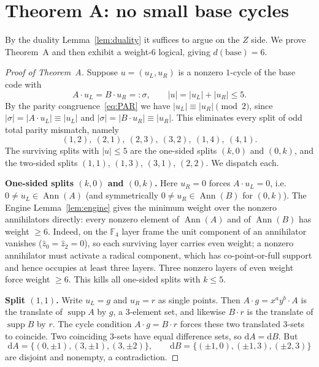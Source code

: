\documentclass[11pt]{article}
\newcommand{\F}[1]{\mathbb{F}_{#1}}
\newcommand{\wt}[1]{\lvert #1\rvert}
\DeclareMathOperator{\Ann}{Ann}
\DeclareMathOperator{\supp}{supp}
\theoremstyle{plain}
\theoremstyle{definition}
\theoremstyle{remark}
\begin{document}
\section{Theorem A: no small base cycles}\label{sec:thmA}

By the duality Lemma~\ref{lem:duality} it suffices to argue on the $Z$ side. We prove
Theorem~A and then exhibit a weight-$6$ logical, giving $d(\mathrm{base})=6$.

\begin{proof}[Proof of Theorem~A]
Suppose $u=(u_L,u_R)$ is a nonzero $1$-cycle of the base code with
\[
  A\cdot u_L=B\cdot u_R=:\sigma,\qquad \wt{u}=\wt{u_L}+\wt{u_R}\le 5 .
\]
By the parity congruence~\eqref{eq:PAR} we have $\wt{u_L}\equiv\wt{u_R}\pmod 2$, since
$\wt{\sigma}=\wt{A\cdot u_L}\equiv\wt{u_L}$ and $\wt{\sigma}=\wt{B\cdot u_R}\equiv\wt{u_R}$.
This eliminates every split of odd total parity mismatch, namely
\[
  (1,2),\ (2,1),\ (2,3),\ (3,2),\ (1,4),\ (4,1).
\]
The surviving splits with $\wt{u}\le 5$ are the one-sided splits $(k,0)$ and $(0,k)$, and
the two-sided splits $(1,1)$, $(1,3)$, $(3,1)$, $(2,2)$. We dispatch each.

\medskip
\noindent\textbf{One-sided splits $(k,0)$ and $(0,k)$.}
Here $u_R=0$ forces $A\cdot u_L=0$, i.e.\ $0\ne u_L\in\Ann(A)$ (and symmetrically
$0\ne u_R\in\Ann(B)$ for $(0,k)$). The Engine Lemma~\ref{lem:engine} gives the minimum
weight over the nonzero annihilators directly: every nonzero element of $\Ann(A)$ and of
$\Ann(B)$ has weight $\ge 6$. Indeed, on the $\F4$ layer frame the unit component of an
annihilator vanishes ($\hat z_0=\hat z_2=0$), so each surviving layer carries even weight;
a nonzero annihilator must activate a radical component, which has co-point-or-full support
and hence occupies at least three layers. Three nonzero layers of even weight force weight
$\ge 6$. This kills all one-sided splits with $k\le 5$.

\medskip
\noindent\textbf{Split $(1,1)$.}
Write $u_L=g$ and $u_R=r$ as single points. Then
$A\cdot g=x^a y^b\cdot A$ is the translate of $\supp A$ by $g$, a $3$-element set, and
likewise $B\cdot r$ is the translate of $\supp B$ by $r$. The cycle condition
$A\cdot g=B\cdot r$ forces these two translated $3$-sets to coincide. Two coinciding
$3$-sets have equal difference sets, so $\mathrm dA=\mathrm dB$. But
\[
  \mathrm dA=\{(0,\pm1),(3,\pm1),(3,\pm2)\},\qquad
  \mathrm dB=\{(\pm1,0),(\pm1,3),(\pm2,3)\}
\]
are disjoint and nonempty, a contradiction.


\end{proof}
\end{document}

